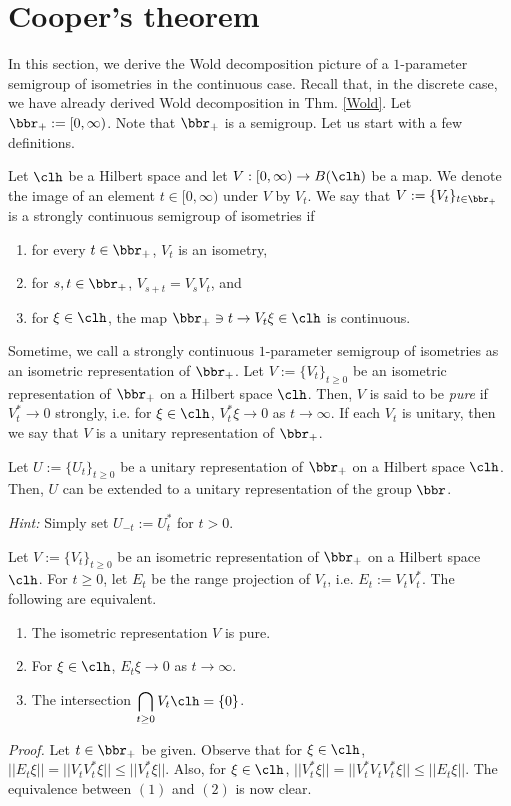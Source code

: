 \section{Cooper's theorem}
 In this section, we derive the Wold decomposition picture of a  $1$-parameter semigroup of isometries in the continuous case. Recall that, in the discrete case, we have already derived Wold decomposition in Thm. \ref{Wold}. Let $\bbr_{+}:=[0,\infty)$. Note that $\bbr_{+}$ is a semigroup. 
 Let us start with a few definitions. 
  \begin{dfn}
 Let $\clh$ be a Hilbert space and let $V:[0,\infty) \to B(\clh)$ be a map. We denote the image of an element $t \in [0,\infty)$ under $V$ by $V_t$. We say that $V:=\{V_t\}_{t \in \bbr_{+}}$ is a strongly continuous semigroup of isometries if 
 \begin{enumerate}
 \item[(1)] for every $t \in \bbr_{+}$, $V_t$ is an isometry,
 \item[(2)] for $s,t \in \bbr_{+}$, $V_{s+t}=V_s V_t$, and
 \item[(3)] for $\xi \in \clh$, the map $\bbr_{+} \ni t \to V_t \xi \in \clh$ is continuous. 
 \end{enumerate}
  \end{dfn}
  Sometime, we call a strongly continuous $1$-parameter semigroup of isometries as an isometric representation of $\bbr_{+}$. Let $V:=\{V_t\}_{t \geq 0}$ be an isometric representation of $\bbr_{+}$ on  a Hilbert space $\clh$. Then, $V$ is said to be \emph{pure} if $V_{t}^{*} \to 0$ strongly, i.e. for $\xi \in \clh$, $V_{t}^{*}\xi \to 0$ as $t \to \infty$. If each $V_t$ is  unitary, then we say that $V$ is a unitary representation of $\bbr_{+}$. 
  
  \begin{xrcs}
  Let $U:=\{U_t\}_{t \geq 0}$ be a unitary representation  of $\bbr_{+}$ on a Hilbert space $\clh$. Then, $U$ can be extended to a unitary representation of the group $\bbr$. 
    \end{xrcs}
  \textit{Hint:} Simply set $U_{-t}:=U_{t}^{*}$ for $t>0$. 
  
  
 \begin{ppsn}
Let $V:=\{V_t\}_{t \geq 0}$ be an isometric representation of $\bbr_{+}$ on a Hilbert space $\clh$. For $t \geq 0$, let $E_t$ be the range projection of $V_t$, i.e. $E_t:=V_{t}V_{t}^{*}$. The following are equivalent. 
\begin{enumerate}
\item[(1)] The isometric representation $V$ is pure. 
\item[(2)] For $\xi \in \clh$, $E_{t}\xi \to 0$ as $t \to \infty$. 
\item[(3)] The intersection $\displaystyle \bigcap_{t \geq 0}V_t\clh=\{0\}$. 
\end{enumerate}
\end{ppsn}  
\textit{Proof.} Let $t \in \bbr_{+}$ be given. Observe that for $\xi \in \clh$, $||E_t\xi|| =||V_tV_{t}^{*}\xi|| \leq ||V_t^{*}\xi||$. Also, for $\xi \in \clh$, 
$
||V_{t}^{*}\xi||=||V_{t}^{*}V_{t}V_{t}^{*}\xi|| \leq ||E_t\xi||$. The equivalence between $(1)$ and $(2)$ is now clear. 

